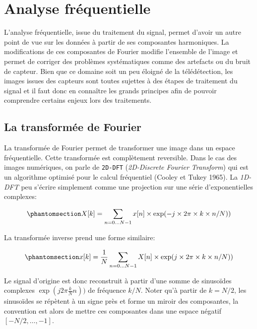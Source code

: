 \documentclass[
  11pt,
  letterpaper,
  open=any,
  twoside=false,
  french]{scrbook}
\begin{document}
\section{Analyse fréquentielle}\label{analyse-fruxe9quentielle}

L'analyse fréquentielle, issue du traitement du signal, permet d'avoir
un autre point de vue sur les données à partir de ses composantes
harmoniques. La modifications de ces composantes de Fourier modifie
l'ensemble de l'image et permet de corriger des problèmes systématiques
comme des artefacts ou du bruit de capteur. Bien que ce domaine soit un
peu éloigné de la télédétection, les images issues des capteurs sont
toutes sujettes à des étapes de traitement du signal et il faut donc en
connaître les grands principes afin de pouvoir comprendre certains
enjeux lors des traitements.

\subsection{La transformée de
Fourier}\label{la-transformuxe9e-de-fourier}

La transformée de Fourier permet de transformer une image dans un espace
fréquentielle. Cette transformée est complètement reversible. Dans le
cas des images numériques, on parle de \texttt{2D-DFT}
(\emph{2D-Discrete Fourier Transform}) qui est un algorithme optimisé
pour le calcul fréquentiel (Cooley et Tukey 1965). La \emph{1D-DFT} peu
s'écrire simplement comme une projection sur une série d'exponentielles
complexes:

\begin{equation}\phantomsection\label{eq-dft}{X[k] = \sum_{n=0 \ldots N-1} x[n] \times \exp(-j \times 2\pi \times k \times n/N))}\end{equation}

La transformée inverse prend une forme similaire:

\begin{equation}\phantomsection\label{eq-idft}{x[k] = \frac{1}{N}\sum_{n=0 \ldots N-1} X[n] \times \exp(j \times 2\pi \times k \times n/N))}\end{equation}

Le signal d'origine est donc reconstruit à partir d'une somme de
sinusoïdes complexes \(\exp(j2\pi \frac{k}{N}n))\) de fréquence \(k/N\).
Noter qu'à partir de \(k=N/2\), les sinusoïdes se répètent à un signe
près et forme un miroir des composantes, la convention est alors de
mettre ces composantes dans une espace négatif \([-N/2,\ldots,-1]\).
\end{document}
